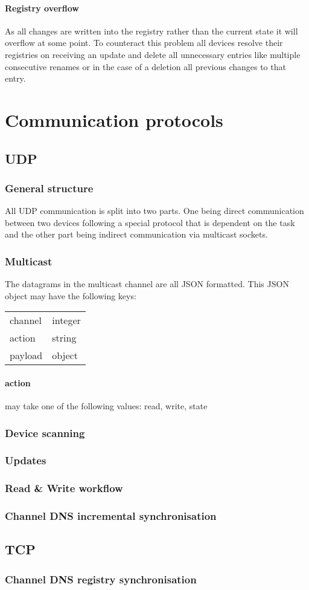 \documentclass[a4paper]{article}
\begin{document}
        \paragraph{Registry overflow} As all changes are written into the registry rather than the current state it will
            overflow at some point. To counteract this problem all devices resolve their registries on receiving an
            update and delete all unnecessary entries like multiple consecutive renames or in the case of a deletion all
            previous changes to that entry.
    \section{Communication protocols}
        \subsection{UDP}
	        \subsubsection{General structure}
		        All UDP communication is split into two parts. One being direct communication between two devices
		        following a special protocol that is dependent on the task and the other part being indirect
		        communication via multicast sockets.
		    \subsubsection{Multicast}
			    The datagrams in the multicast channel are all JSON formatted. This JSON object may have the following
			    keys:\\
			    \begin{tabular}{l | l}
			        channel & integer\\
			    	action & string\\
			    	payload & object
			    \end{tabular}
			    \paragraph{action} may take one of the following values: read, write, state
	        \subsubsection{Device scanning}
            \subsubsection{Updates}
            \subsubsection{Read \& Write workflow}
            \subsubsection{Channel DNS incremental synchronisation}
        \subsection{TCP}
            \subsubsection{Channel DNS registry synchronisation}
\end{document}
